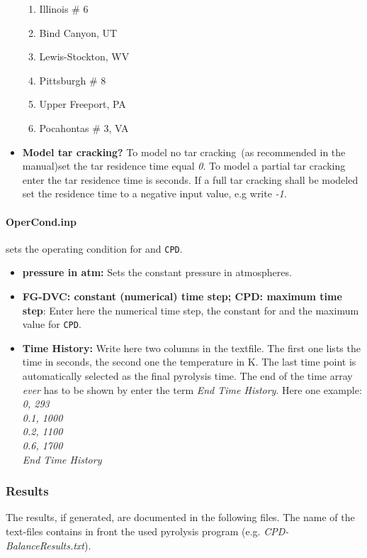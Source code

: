 \begin{itemize}
\begin{enumerate}
  \item Illinois \# 6
  \item Bind Canyon, UT
  \item Lewis-Stockton, WV
  \item Pittsburgh \# 8
  \item Upper Freeport, PA
  \item Pocahontas \# 3, VA
 \end{enumerate}
 \item \textbf{Model tar cracking?} To model no tar cracking~(as recommended in the \FGDVC manual)set the tar residence time equal \emph{0}. To model a partial tar cracking enter the tar residence time is seconds. If a full tar cracking shall be modeled set the residence time to a negative input value, e.g write \emph{-1}.           
\end{itemize}

\paragraph{OperCond.inp} sets the operating condition for \FGDVC and \texttt{CPD}.
\begin{itemize}
  \item \textbf{pressure in atm:} Sets the constant pressure in atmospheres.
 \item \textbf{FG-DVC: constant (numerical) time step; CPD: maximum time step}: Enter here the numerical time step, the constant for \FGDVC and the maximum value for \texttt{CPD}.
 \item \textbf{Time History:} Write here two columns in the textfile. The first one lists the time in seconds, the second one the temperature in K. The last time point is automatically selected as the final pyrolysis time. The end of the time array \emph{ever} has to be shown by enter the term \emph{End Time History}. Here one example:\\
\emph{0, 293\\
0.1, 1000\\
0.2, 1100\\
0.6, 1700\\
End Time History\\}
\end{itemize}


\subsubsection{Results}\label{SS_ResultsFiles}
The results, if generated, are documented in the following files. The name of the text-files contains in front the used pyrolysis program (e.g. \emph{CPD-BalanceResults.txt}).

